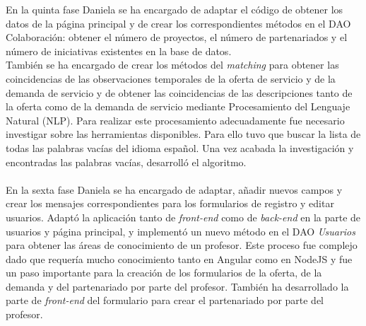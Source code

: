 \documentclass[11pt]{book}
\begin{document}
En la quinta fase Daniela se ha encargado de adaptar el código de obtener los datos de la página principal y de crear los correspondientes métodos en el DAO Colaboración: obtener el número de proyectos, el número de partenariados y el número de iniciativas existentes en la base de datos.\\ 
También se ha encargado de crear los métodos del \emph{matching} para obtener las coincidencias de las observaciones temporales de la oferta de servicio y de la demanda de servicio y de obtener las coincidencias de las descripciones tanto de la oferta como de la demanda de servicio mediante Procesamiento del Lenguaje Natural (NLP). Para realizar este procesamiento adecuadamente fue necesario investigar sobre las herramientas disponibles. Para ello tuvo que buscar la lista de todas las palabras vacías del idioma español. Una vez acabada la investigación y encontradas las palabras vacías, desarrolló el algoritmo.\\\\
En la sexta fase Daniela se ha encargado de adaptar, añadir nuevos campos y crear los mensajes correspondientes para los formularios de registro y editar usuarios. Adaptó la aplicación tanto de \textit{front-end} como de \textit{back-end} en la parte de usuarios y página principal, y implementó un nuevo método en el DAO \textit{Usuarios} para obtener las áreas de conocimiento de un profesor. Este proceso fue complejo dado que requería mucho conocimiento tanto en Angular como en NodeJS y fue un paso importante para la creación de los formularios de la oferta, de la demanda y del partenariado por parte del profesor. También ha desarrollado la parte de \textit{front-end} del formulario para crear el partenariado por parte del profesor.
\end{document}
